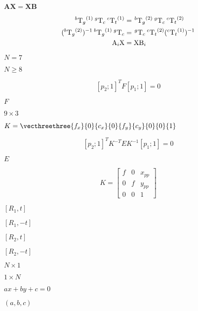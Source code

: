 \documentclass{article}
\begin{document}
$\mathbf{A}\mathbf{X}=\mathbf{X}\mathbf{B}$
\pagebreak

\[ \begin{align*} ^{b}{\textrm{T}_g}^{(1)} \hspace{0.2em} ^{g}\textrm{T}_c \hspace{0.2em} ^{c}{\textrm{T}_t}^{(1)} &= \hspace{0.1em} ^{b}{\textrm{T}_g}^{(2)} \hspace{0.2em} ^{g}\textrm{T}_c \hspace{0.2em} ^{c}{\textrm{T}_t}^{(2)} \\ (^{b}{\textrm{T}_g}^{(2)})^{-1} \hspace{0.2em} ^{b}{\textrm{T}_g}^{(1)} \hspace{0.2em} ^{g}\textrm{T}_c &= \hspace{0.1em} ^{g}\textrm{T}_c \hspace{0.2em} ^{c}{\textrm{T}_t}^{(2)} (^{c}{\textrm{T}_t}^{(1)})^{-1} \\ \textrm{A}_i \textrm{X} &= \textrm{X} \textrm{B}_i \\ \end{align*} \]
\pagebreak

$N = 7$
\pagebreak

$N \ge 8$
\pagebreak

\[[p_2; 1]^T F [p_1; 1] = 0\]
\pagebreak

$F$
\pagebreak

$9 \times 3$
\pagebreak

$K = \vecthreethree{f_x}{0}{c_x}{0}{f_y}{c_y}{0}{0}{1}$
\pagebreak

\[[p_2; 1]^T K^{-T} E K^{-1} [p_1; 1] = 0\]
\pagebreak

$E$
\pagebreak

\[K = \begin{bmatrix} f & 0 & x_{pp} \\ 0 & f & y_{pp} \\ 0 & 0 & 1 \end{bmatrix}\]
\pagebreak

$[R_1, t]$
\pagebreak

$[R_1, -t]$
\pagebreak

$[R_2, t]$
\pagebreak

$[R_2, -t]$
\pagebreak

$N \times 1$
\pagebreak

$1 \times N$
\pagebreak

$ax + by + c=0$
\pagebreak

$(a, b, c)$
\pagebreak
\end{document}
